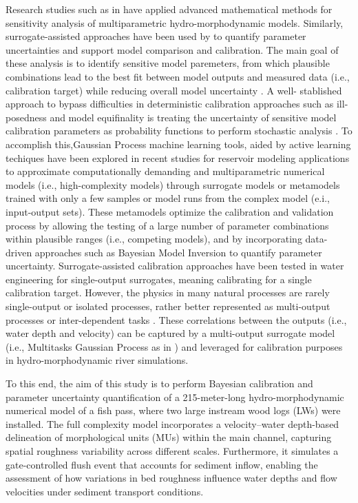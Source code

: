\documentclass[draft,linenumbers,onecolumn]{agujournal2019} %
\begin{document}
Research studies such as in  have applied advanced mathematical methods for sensitivity analysis of multiparametric hydro-morphodynamic models. Similarly, surrogate-assisted approaches have been used by  \cite{mohammadi2018bayesian,beckers2020bayesian} to quantify parameter uncertainties and support model comparison and calibration. The main goal of these analysis is to identify sensitive model paremeters, from which plausible combinations lead to the best fit between model outputs and measured data (i.e., calibration target) while reducing overall model uncertainty \cite{oberkampf2004verification}. A well- stablished approach to bypass difficulties in deterministic calibration approaches such as ill-posedness and model equifinality is treating the uncertainty of sensitive model calibration parameters as probability functions to perform stochastic analysis \cite{kim2016stepwise}. To accomplish this,Gaussian Process machine learning tools, aided by active learning techiques have been explored in recent studies for reservoir modeling applications \cite{schwindt2023bayesian, mouris2023stability} to approximate computationally demanding and multiparametric numerical models (i.e., high-complexity models) through surrogate models or metamodels trained with only a few samples or model runs from the complex model (e.i., input-output sets). These metamodels optimize the calibration and validation process by allowing the testing of a large number of parameter combinations within plausible ranges (i.e., competing models), and by incorporating data-driven approaches such as Bayesian Model Inversion \cite{mohammadi2018bayesian} to quantify parameter uncertainty. Surrogate-assisted calibration approaches have been tested in water engineering for single-output surrogates, meaning calibrating for a single calibration target. However, the physics in many natural processes are rarely single-output or isolated processes, rather better represented as multi-output processes \cite{ferreira2022multioutput} or inter-dependent tasks \cite{bonilla2007multitask}. These correlations between the outputs (i.e., water depth and velocity) can be captured by a multi-output surrogate model (i.e., Multitasks Gaussian Process as in \cite{bonilla2007multitask}) and leveraged for calibration purposes in hydro-morphodynamic river simulations. 

% 
To this end, the aim of this study is to perform Bayesian calibration and parameter uncertainty quantification of a 215-meter-long hydro-morphodynamic numerical model of a fish pass, where two large instream wood logs (LWs) were installed. The full complexity model incorporates a velocity–water depth-based delineation of morphological units (MUs) within the main channel, capturing spatial roughness variability across different scales. Furthermore, it simulates a gate-controlled flush event that accounts for sediment inflow, enabling the assessment of how variations in bed roughness influence water depths and flow velocities under sediment transport conditions.
\end{document}
